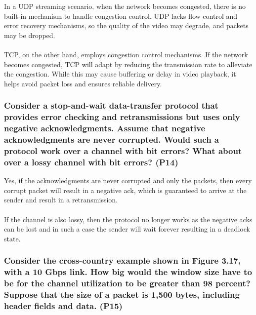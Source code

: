 In a UDP streaming scenario, when the network becomes congested, there is no built-in mechanism to handle congestion control. UDP lacks flow control and error recovery mechanisms, so the quality of the video may degrade, and packets may be dropped. \\
\\
TCP, on the other hand, employs congestion control mechanisms. If the network becomes congested, TCP will adapt by reducing the transmission rate to alleviate the congestion. While this may cause buffering or delay in video playback, it helps avoid packet loss and ensures reliable delivery.


\subsubsection{Consider a stop-and-wait data-transfer protocol that provides error checking and retransmissions but uses only negative acknowledgments. Assume that negative acknowledgments are never corrupted. Would such a protocol work over a channel with bit errors? What about over a lossy channel with bit errors? (P14)}

Yes, if the acknowledgments are never corrupted and only the packets, then every corrupt packet will result in a negative ack, which is guaranteed to arrive at the sender and result in a retransmission. \\
\\
If the channel is also lossy, then the protocol no longer works as the negative acks can be lost and in such a case the sender will wait forever resulting in a deadlock state.


\subsubsection{Consider the cross-country example shown in Figure 3.17, with a 10 Gbps link. How big would the window size have to be for the channel utilization to be greater than 98 percent? Suppose that the size of a packet is 1,500 bytes, including header fields and data. (P15)}

